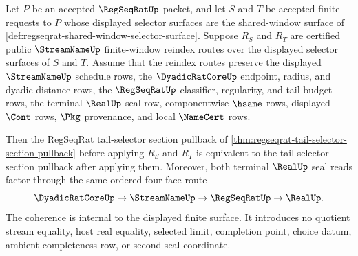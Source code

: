 \begin{theorem}
\label{thm:regseqrat-shared-window-reindex-pullback-coherence}
Let $P$ be an accepted $\RegSeqRatUp$ packet, and let $S$ and $T$ be accepted finite requests to $P$ whose displayed selector surfaces are the shared-window surface of \autoref{def:regseqrat-shared-window-selector-surface}. Suppose $R_S$ and $R_T$ are certified public $\StreamNameUp$ finite-window reindex routes over the displayed selector surfaces of $S$ and $T$. Assume that the reindex routes preserve the displayed $\StreamNameUp$ schedule rows, the $\DyadicRatCoreUp$ endpoint, radius, and dyadic-distance rows, the $\RegSeqRatUp$ classifier, regularity, and tail-budget rows, the terminal $\RealUp$ seal row, componentwise $\hsame$ rows, displayed $\Cont$ rows, $\Pkg$ provenance, and local $\NameCert$ rows.

Then the RegSeqRat tail-selector section pullback of \autoref{thm:regseqrat-tail-selector-section-pullback} before applying $R_S$ and $R_T$ is equivalent to the tail-selector section pullback after applying them. Moreover, both terminal $\RealUp$ seal reads factor through the same ordered four-face route
$$
\DyadicRatCoreUp \to \StreamNameUp \to \RegSeqRatUp \to \RealUp .
$$
The coherence is internal to the displayed finite surface. It introduces no quotient stream equality, host real equality, selected limit, completion point, choice datum, ambient completeness row, or second seal coordinate.
\end{theorem}
